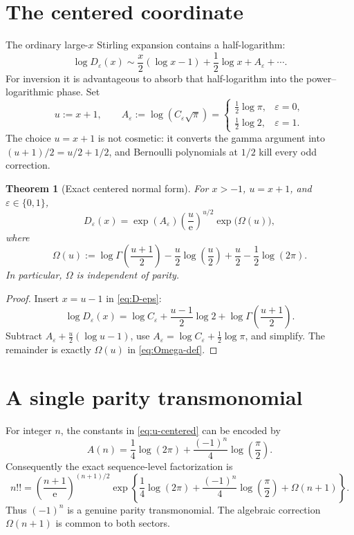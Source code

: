 \documentclass[11pt,a4paper,oneside]{book}
\newtheorem{theorem}{Theorem}[chapter]
\newcommand{\e}{\mathrm e}
\newcommand{\eps}{\varepsilon}
\begin{document}
\section{The centered coordinate}

The ordinary large-\(x\) Stirling expansion contains a half-logarithm:
\[
 \log D_\eps(x)
 \sim
 \frac{x}{2}(\log x-1)+\frac12\log x+A_\eps+\cdots.
\]
For inversion it is advantageous to absorb that half-logarithm into the
power--logarithmic phase.  Set
\begin{equation}\label{eq:u-centered}
 u:=x+1,
 \qquad
 A_\eps:=\log(C_\eps\sqrt\pi)
 =\begin{cases}
   \frac12\log\pi,&\eps=0,\\[2mm]
   \frac12\log2,&\eps=1.
  \end{cases}
\end{equation}
The choice \(u=x+1\) is not cosmetic: it converts the gamma argument into
\((u+1)/2=u/2+1/2\), and Bernoulli polynomials at \(1/2\) kill every odd
correction.

\begin{theorem}[Exact centered normal form]\label{thm:exact-normal}
For \(x>-1\), \(u=x+1\), and \(\eps\in\{0,1\}\),
\begin{equation}\label{eq:exact-factorization}
 D_\eps(x)
 =\exp(A_\eps)
  \left(\frac{u}{\e}\right)^{u/2}
  \exp\!\bigl(\Omega(u)\bigr),
\end{equation}
where
\begin{equation}\label{eq:Omega-def}
 \Omega(u):=
 \log\Gamma\!\left(\frac{u+1}{2}\right)
 -\frac{u}{2}\log\!\left(\frac{u}{2}\right)
 +\frac{u}{2}-\frac12\log(2\pi).
\end{equation}
In particular, \(\Omega\) is independent of parity.
\end{theorem}

\begin{proof}
Insert \(x=u-1\) in \cref{eq:D-eps}:
\[
 \log D_\eps(x)
 =\log C_\eps+\frac{u-1}{2}\log2
  +\log\Gamma\!\left(\frac{u+1}{2}\right).
\]
Subtract \(A_\eps+\tfrac{u}{2}(\log u-1)\), use
\(A_\eps=\log C_\eps+\tfrac12\log\pi\), and simplify.  The remainder is exactly
\(\Omega(u)\) in \cref{eq:Omega-def}.
\end{proof}

\section{A single parity transmonomial}

For integer \(n\), the constants in \cref{eq:u-centered} can be encoded by
\[
 A(n)=\frac14\log(2\pi)
      +\frac{(-1)^n}{4}\log\!\left(\frac{\pi}{2}\right).
\]
Consequently the exact sequence-level factorization is
\begin{equation}\label{eq:sequence-exact}
 n!!
 =\left(\frac{n+1}{\e}\right)^{(n+1)/2}
  \exp\!\left\{
   \frac14\log(2\pi)
   +\frac{(-1)^n}{4}\log\!\left(\frac{\pi}{2}\right)
   +\Omega(n+1)
  \right\}.
\end{equation}
Thus \((-1)^n\) is a genuine parity transmonomial.  The algebraic correction
\(\Omega(n+1)\) is common to both sectors.
\end{document}
